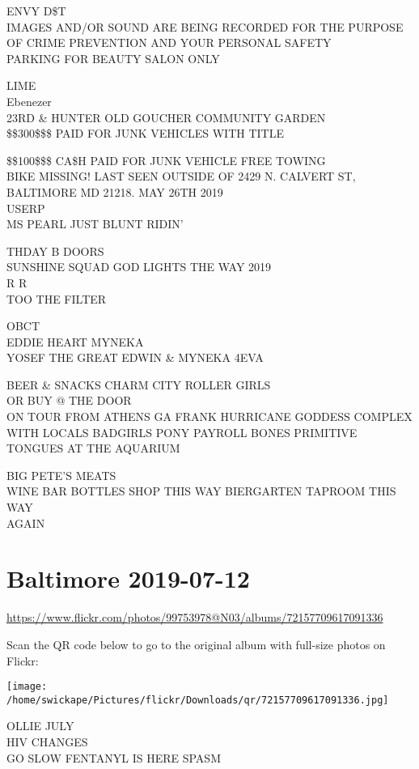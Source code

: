 \documentclass[10pt,letterpaper]{article}
\begin{document}
ENVY D\$T\\
IMAGES AND/OR SOUND ARE BEING RECORDED FOR THE PURPOSE OF CRIME PREVENTION AND YOUR PERSONAL SAFETY\\
PARKING FOR BEAUTY SALON ONLY

LIME\\
Ebenezer\\
23RD \& HUNTER OLD GOUCHER COMMUNITY GARDEN\\
\$\$300\$\$\$ PAID FOR JUNK VEHICLES WITH TITLE

\$\$100\$\$\$ CA\$H PAID FOR JUNK VEHICLE FREE TOWING\\
BIKE MISSING!  LAST SEEN OUTSIDE OF 2429 N. CALVERT ST, BALTIMORE MD 21218.  MAY 26TH 2019\\
USERP\\
MS PEARL JUST BLUNT RIDIN'

THDAY B DOORS\\
SUNSHINE SQUAD GOD LIGHTS THE WAY 2019\\
R R\\
TOO THE FILTER

OBCT\\
EDDIE HEART MYNEKA\\
YOSEF THE GREAT EDWIN \& MYNEKA 4EVA

BEER \& SNACKS CHARM CITY ROLLER GIRLS\\
OR BUY @ THE DOOR\\
ON TOUR FROM ATHENS GA FRANK HURRICANE GODDESS COMPLEX WITH LOCALS BADGIRLS PONY PAYROLL BONES PRIMITIVE TONGUES AT THE AQUARIUM

BIG PETE'S MEATS\\
WINE BAR BOTTLES SHOP THIS WAY BIERGARTEN TAPROOM THIS WAY\\
AGAIN
\pagebreak

\section*{Baltimore 2019-07-12}

\url{https://www.flickr.com/photos/99753978@N03/albums/72157709617091336}

Scan the QR code below to go to the original album with full-size photos on Flickr:

\texttt{[image: /home/swickape/Pictures/flickr/Downloads/qr/72157709617091336.jpg]}
\pagebreak

OLLIE JULY\\
HIV CHANGES\\
GO SLOW FENTANYL IS HERE SPASM
\end{document}
